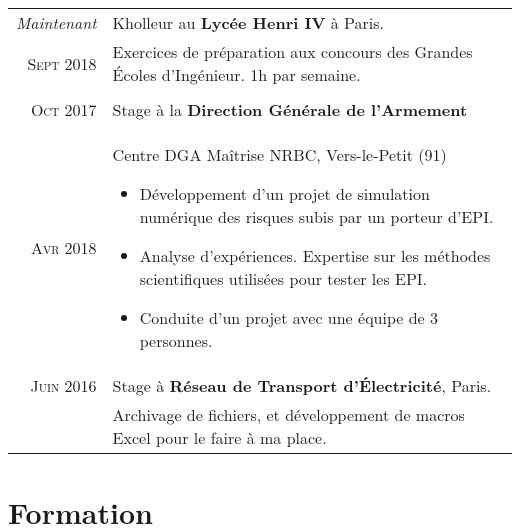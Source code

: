 \documentclass[a4paper,10pt]{article} %
\begin{document}
\begin{tabularx}{\linewidth}{r|X}
  \emph{Maintenant} & Kholleur au \textbf{Lycée Henri IV} à Paris.\\
  \textsc{Sept 2018} & \small{Exercices de préparation aux concours des Grandes Écoles d'Ingénieur. 1h par semaine.}
  \\&\\

\textsc{Oct 2017} & Stage à la \textbf{Direction Générale de l'Armement}\\
\textsc{Avr 2018} & \small{Centre DGA Maîtrise NRBC, Vers-le-Petit (91)
\begin{itemize}[noitemsep, nolistsep, leftmargin=0.5cm]
  \item Développement d'un projet de simulation numérique des risques subis par un porteur d'EPI.
  \item Analyse d'expériences. Expertise sur les méthodes scientifiques utilisées pour tester les EPI.
  \item Conduite d'un projet avec une équipe de 3 personnes.
\end{itemize}}\\


\textsc{Juin 2016} & Stage à \textbf{Réseau de Transport d'Électricité}, Paris. \\
& \small{Archivage de fichiers, et développement de macros Excel pour le faire à ma place.}
\end{tabularx}


\section{Formation}
\end{document}
